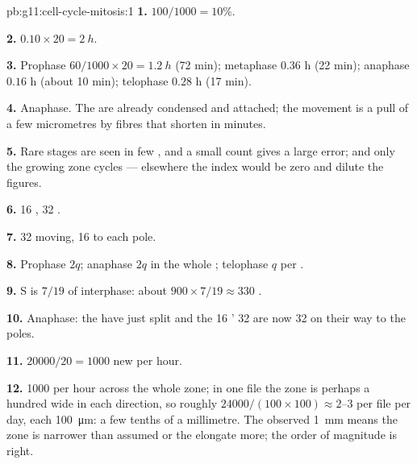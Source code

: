 \begin{solution}{pb:g11:cell-cycle-mitosis:1}
\textbf{1.} $100/1000 = 10\%$.

\textbf{2.} $0.10 \times 20 = \qty{2}{h}$.

\textbf{3.} Prophase $60/1000 \times 20 = \qty{1.2}{h}$ (72 min);
metaphase $0.36$ h (22 min); anaphase $0.16$ h (about 10 min);
telophase $0.28$ h (17 min).

\textbf{4.} Anaphase. The  are already condensed and
attached; the movement is a pull of a few micrometres by fibres that
shorten in minutes.

\textbf{5.} Rare stages are seen in few , and a small count gives
a large error; and only the growing zone cycles --- elsewhere the
index would be zero and dilute the figures.

\textbf{6.} 16 , 32 .

\textbf{7.} 32  moving, 16 to each pole.

\textbf{8.} Prophase $2q$; anaphase $2q$ in the whole ; telophase
$q$ per .

\textbf{9.} S is $7/19$ of interphase: about $900 \times 7/19 \approx
330$ .

\textbf{10.} Anaphase: the  have just split and the 16
' 32  are now 32  on their way to the
poles.

\textbf{11.} $\num{20000}/20 = 1000$ new  per hour.

\textbf{12.} 1000  per hour across the whole zone; in one file the
zone is perhaps a hundred  wide in each direction, so roughly
$\num{24000}/(100 \times 100) \approx 2$--3  per file per day,
each \qty{100}{\micro m}: a few tenths of a millimetre. The observed
\qty{1}{mm} means the zone is narrower than assumed or the 
elongate more; the order of magnitude is right.


\end{solution}
